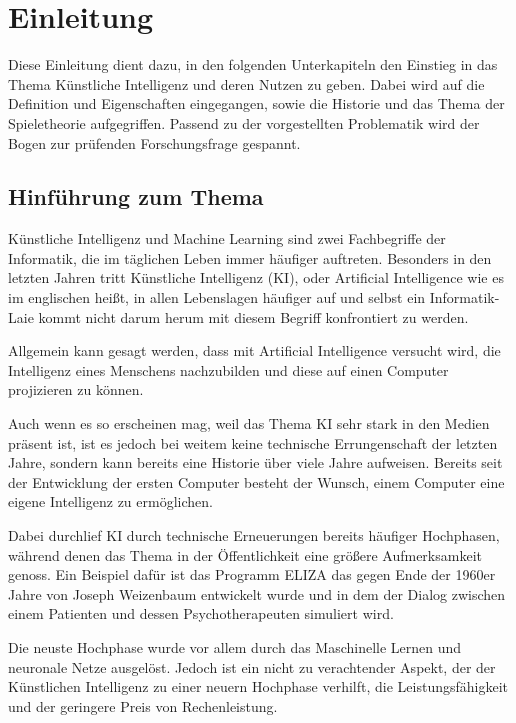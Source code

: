 
\chapter{Einleitung}
Diese Einleitung dient dazu, in den folgenden Unterkapiteln den Einstieg in das Thema Künstliche Intelligenz und deren Nutzen zu geben. Dabei wird auf die Definition und Eigenschaften eingegangen, sowie die Historie und das Thema der Spieletheorie aufgegriffen. Passend zu der vorgestellten Problematik wird der Bogen zur prüfenden Forschungsfrage gespannt.

\section{Hinführung zum Thema}
Künstliche Intelligenz und Machine Learning sind zwei Fachbegriffe der Informatik, die im täglichen Leben immer häufiger auftreten. Besonders in den letzten Jahren tritt Künstliche Intelligenz (\acs{KI}), oder Artificial Intelligence wie es im englischen heißt, in allen Lebenslagen häufiger auf und selbst ein Informatik-Laie kommt nicht darum herum mit diesem Begriff konfrontiert zu werden. 

Allgemein kann gesagt werden, dass mit Artificial Intelligence versucht wird, die Intelligenz eines Menschens nachzubilden und diese auf einen Computer projizieren zu können.

Auch wenn es so erscheinen mag, weil das Thema KI sehr stark in den Medien präsent ist, ist es jedoch bei weitem keine technische Errungenschaft der letzten Jahre, sondern kann bereits eine Historie über viele Jahre aufweisen. Bereits seit der Entwicklung der ersten Computer besteht der Wunsch, einem Computer eine eigene Intelligenz zu ermöglichen.

Dabei durchlief KI durch technische Erneuerungen bereits häufiger Hochphasen, während denen das Thema in der Öffentlichkeit eine größere Aufmerksamkeit genoss. Ein Beispiel dafür ist das Programm ELIZA das gegen Ende der 1960er Jahre von Joseph Weizenbaum entwickelt wurde und in dem der Dialog zwischen einem Patienten und dessen Psychotherapeuten simuliert wird.\cite{Weizenbaum1966}


Die neuste Hochphase wurde vor allem durch das Maschinelle Lernen und neuronale Netze ausgelöst. Jedoch ist ein nicht zu verachtender Aspekt, der der Künstlichen Intelligenz zu einer neuern Hochphase verhilft, die Leistungsfähigkeit und der geringere Preis von Rechenleistung. 

